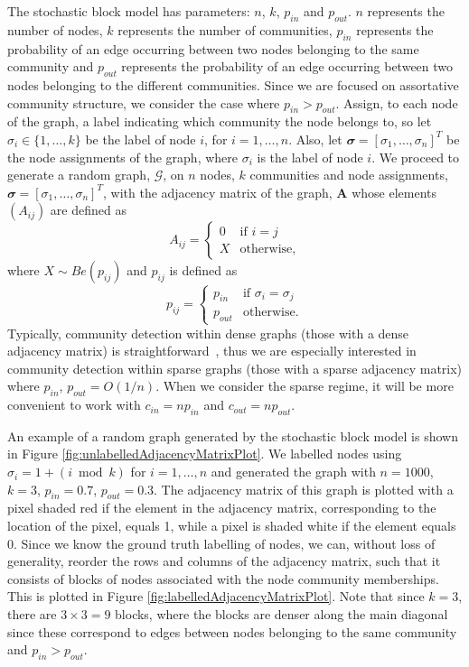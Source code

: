 \documentclass[12pt]{article}
\numberwithin{equation}{section}
\begin{document}
The stochastic block model has parameters: $n$, $k$, $p_{in}$ and $p_{out}$. $n$ represents the number of nodes, $k$ represents the number of communities, $p_{in}$ represents the probability of an edge occurring between two nodes belonging to the same community and $p_{out}$ represents the probability of an edge occurring between two nodes belonging to the different communities. Since we are focused on assortative community structure, we consider the case where $p_{in} > p_{out}$. Assign, to each node of the graph, a label indicating which community the node belongs to, so let $\sigma_{i} \in \{1,\dots,k\}$ be the label of node $i$, for $i = 1,\dots,n$. Also, let $\mathbfit{\sigma} = [\sigma_{1},\dots,\sigma_{n}]^{T}$ be the node assignments of the graph, where $\sigma_{i}$ is the label of node $i$. We proceed to generate a random graph, $\mathcal{G}$, on $n$ nodes, $k$ communities and node assignments, $\mathbfit{\sigma} = [\sigma_{1},\dots,\sigma_{n}]^{T}$, with the adjacency matrix of the graph, $\mathbf{A}$ whose elements $(A_{ij})$ are defined as
\begin{equation*}
	A_{ij} =
	\begin{cases}
		0 & \text{if } i = j\\
		X & \text{otherwise},
	\end{cases}
\end{equation*}
where $X \sim Be(p_{ij})$ and {$p_{ij}$} is defined as
\begin{equation*}
	p_{ij} =
	\begin{cases}
		p_{in} & \text{if } \sigma_{i} = \sigma_{j}\\
		p_{out} & \text{otherwise}.
	\end{cases}
\end{equation*}
Typically, community detection within dense graphs (those with a dense adjacency matrix) is straightforward~\cite{DKM+13}, thus we are especially interested in community detection within sparse graphs (those with a sparse adjacency matrix) where $p_{in}$, $p_{out} = O(1/n)$. When we consider the sparse regime, it will be more convenient to work with $c_{in} = np_{in}$ and $c_{out} = np_{out}$.

An example of a random graph generated by the stochastic block model is shown in Figure \ref{fig:unlabelledAdjacencyMatrixPlot}. We labelled nodes using $\sigma_{i} = 1 + (i \bmod{k})$ for $i = 1,\dots,n$ and generated the graph with $n = 1000$, $k = 3$, $p_{in} = 0.7$, $p_{out} = 0.3$. The adjacency matrix of this graph is plotted with a pixel shaded red if the element in the adjacency matrix, corresponding to the location of the pixel, equals 1, while a pixel is shaded white if the element equals 0. Since we know the ground truth labelling of nodes, we can, without loss of generality, reorder the rows and columns of the adjacency matrix, such that it consists of blocks of nodes associated with the node community memberships. This is plotted in Figure \ref{fig:labelledAdjacencyMatrixPlot}. Note that since $k = 3$, there are $3 \times 3 = 9$ blocks, where the blocks are denser along the main diagonal since these correspond to edges between nodes belonging to the same community and $p_{in} > p_{out}$.
\end{document}
